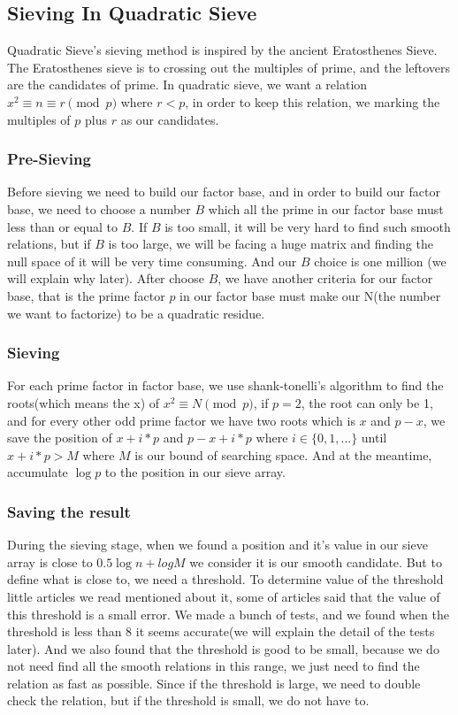 \documentclass[12pt]{article} %
\begin{document}
\subsection {Sieving In Quadratic Sieve}

Quadratic Sieve's sieving method is inspired by the ancient Eratosthenes Sieve. The Eratosthenes sieve is to crossing out the multiples of prime, and the leftovers are the candidates of prime. In quadratic sieve, we want a relation $x^2 \equiv n \equiv r \pmod{p}$ where $r < p$, in order to keep this relation, we marking the multiples of $p$ plus $r$ as our candidates. 

\subsubsection {Pre-Sieving}

Before sieving we need to build our factor base, and in order to build our factor base, we need to choose a number $B$ which all the prime in our factor base must less than or equal to $B$. If $B$ is too small, it will be very hard to find such smooth relations, but if $B$ is too large, we will be facing a huge matrix and finding the null space of it will be very time consuming. And our $B$ choice is one million (we will explain why later). After choose $B$, we have another criteria for our factor base, that is the prime factor $p$ in our factor base must make our N(the number we want to factorize) to be a quadratic residue.

\subsubsection {Sieving}

For each prime factor in factor base, we use shank-tonelli's algorithm to find the roots(which means the x) of $x^2 \equiv N \pmod{p}$, if $p = 2$, the root can only be 1, and for every other odd prime factor we have two roots which is $x$ and $p-x$, we save the position of $x+i*p$ and $p-x+i*p$ where $i \in \{0, 1, \dots \}$ until $x+i*p>M$ where $M$ is our bound of searching space. And at the meantime, accumulate $\log{p}$ to the position in our sieve array.

\subsubsection {Saving the result}

During the sieving stage, when we found a position and it's value in our sieve array is close to $0.5\log{n} + log{M}$ we consider it is our smooth candidate. But to define what is close to, we need a threshold. To determine value of the threshold little articles we read mentioned about it, some of articles said that the value of this threshold is a small error. We made a bunch of tests, and we found when the threshold is less than 8 it seems accurate(we will explain the detail of the tests later). And we also found that the threshold is good to be small, because we do not need find all the smooth relations in this range, we just need to find the relation as fast as possible. Since if the threshold is large, we need to double check the relation, but if the threshold is small, we do not have to.
\end{document}
